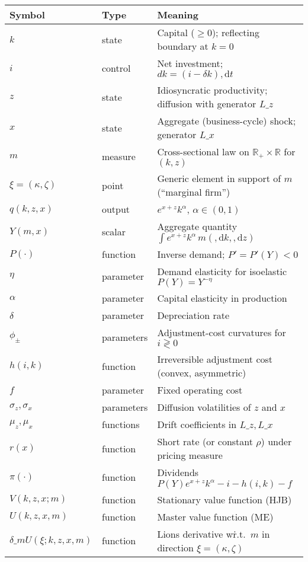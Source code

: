 \documentclass[11pt,letterpaper,oneside]{article}
\numberwithin{equation}{section}
\newcommand{\R}{\mathbb{R}}
\newcommand{\1}{\mathbf{1}}
\newcommand{\diff}{,\mathrm{d}}
\newcommand{\Lz}{L\_z}
\newcommand{\Lx}{L\_x}
\newcommand{\dmU}{\delta\_m U}
\begin{document}
\begin{table}[ht]
\centering
\small
\begin{tabular}{@{} l l p{}}
\toprule
\textbf{Symbol} & \textbf{Type} & \textbf{Meaning} \\
\midrule
$k$ & state & Capital ($\ge 0$); reflecting boundary at $k=0$ \\
$i$ & control & Net investment; $dk=(i-\delta k)\diff t$ \\
$z$ & state & Idiosyncratic productivity; diffusion with generator $\Lz$ \\
$x$ & state & Aggregate (business-cycle) shock; generator $\Lx$ \\
$m$ & measure & Cross-sectional law on $\R_+\times\R$ for $(k,z)$ \\
$\xi=(\kappa,\zeta)$ & point & Generic element in support of $m$ (``marginal firm'') \\
$q(k,z,x)$ & output & $e^{x+z}k^\alpha$, $\alpha\in(0,1)$ \\
$Y(m,x)$ & scalar & Aggregate quantity $\int e^{x+z}k^\alpha\,m(\diff k,\diff z)$ \\
$P(\cdot)$ & function & Inverse demand; $P'=P'(Y)<0$ \\
$\eta$ & parameter & Demand elasticity for isoelastic $P(Y)=Y^{-\eta}$ \\
$\alpha$ & parameter & Capital elasticity in production \\
$\delta$ & parameter & Depreciation rate \\
$\phi_\pm$ & parameters & Adjustment-cost curvatures for $i\gtrless 0$ \\
$h(i,k)$ & function & Irreversible adjustment cost (convex, asymmetric) \\
$f$ & parameter & Fixed operating cost \\
$\sigma_z,\sigma_x$ & parameters & Diffusion volatilities of $z$ and $x$ \\
$\mu_z,\mu_x$ & functions & Drift coefficients in $\Lz,\Lx$ \\
$r(x)$ & function & Short rate (or constant $\rho$) under pricing measure \\
$\pi(\cdot)$ & function & Dividends $P(Y)e^{x+z}k^\alpha - i - h(i,k) - f$ \\
$V(k,z,x;m)$ & function & Stationary value function (HJB) \\
$U(k,z,x,m)$ & function & Master value function (ME) \\
$\dmU(\xi;k,z,x,m)$ & function & Lions derivative w\.r.t.\ $m$ in direction $\xi=(\kappa,\zeta)$ \\

\end{tabular}
\end{table}
\end{document}
